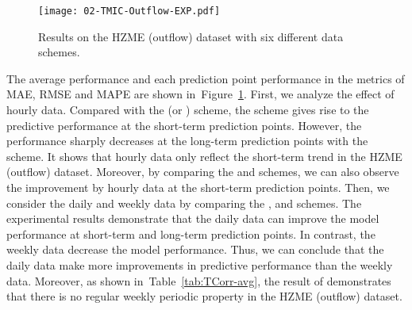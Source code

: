 \documentclass[sn-mathphys,iicol]{sn-jnl}
\newcommand\figref[1]{Figure~\ref{#1}}
\newcommand\tabref[1]{Table~\ref{#1}}
\theoremstyle{thmstyleone}\newtheorem{theorem}{Theorem}\newtheorem{proposition}[theorem]{Proposition}
\theoremstyle{thmstyletwo}\newtheorem{example}{Example}\newtheorem{remark}{Remark}
\theoremstyle{thmstylethree}\newtheorem{definition}{Definition}
\begin{document}
\begin{table}[h]
    \centering
    \caption{The seven data selection schemes on the HZME (outflow) datasets.}
    \label{tab:schemes}
\end{table}





\begin{figure}[!h]
\centering
\texttt{[image: 02-TMIC-Outflow-EXP.pdf]}
\caption{Results on the HZME (outflow) dataset with six different data schemes.}
\label{fig:TCorr-outflow}
\end{figure}



The average performance and each prediction point performance in the metrics of MAE, RMSE and MAPE are shown in~\figref{fig:TCorr-outflow}. First, we analyze the effect of hourly data. Compared with the  (or ) scheme, the  scheme gives rise to the predictive performance at the short-term prediction points. However, the performance sharply decreases at the long-term prediction points with the  scheme. It shows that hourly data only reflect the short-term trend in the HZME (outflow) dataset. Moreover, by comparing the  and  schemes, we can also observe the improvement by hourly data at the short-term prediction points. Then, we consider the daily and weekly data by comparing the ,  and  schemes. The experimental results demonstrate that the daily data can improve the model performance at short-term and long-term prediction points. In contrast, the weekly data decrease the model performance. Thus, we can conclude that the daily data make more improvements in predictive performance than the weekly data. Moreover, as shown in~\tabref{tab:TCorr-avg}, the result of  demonstrates that there is no regular weekly periodic property in the HZME (outflow) dataset.
\end{document}
